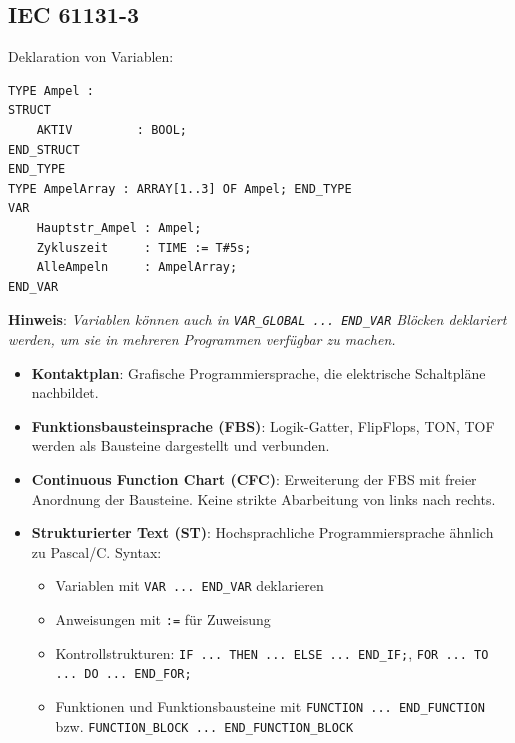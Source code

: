 \documentclass[9pt, a3paper, landscape]{article}
\newcommand{\algo}[1]{\textbf{\textcolor{blue!60!black}{#1}}}
\begin{document}
\begin{multicols*}{4}
\begin{itemize}
\section{IEC 61131-3}
Deklaration von Variablen:

\begin{lstlisting}[language=ST, numbers=none]
TYPE Ampel :
STRUCT
    AKTIV         : BOOL;
END_STRUCT
END_TYPE
TYPE AmpelArray : ARRAY[1..3] OF Ampel; END_TYPE
VAR
    Hauptstr_Ampel : Ampel;
    Zykluszeit     : TIME := T#5s;
    AlleAmpeln     : AmpelArray;
END_VAR
\end{lstlisting}

\algo{Hinweis}: \textit{Variablen können auch in \lstinline|VAR_GLOBAL ... END_VAR| Blöcken deklariert werden, um sie in mehreren Programmen verfügbar zu machen.}

\begin{itemize}
\item \algo{Kontaktplan}: Grafische Programmiersprache, die elektrische Schaltpläne nachbildet.
\begin{itemize}
    \item \texttt{--\verb|][--}: Öffner
    \item \texttt{--\verb|]\textbackslash{}[--}: Schließer 
    \item \texttt{--()\!--}: Spule (Aktor)
\end{itemize}
\item \algo{Funktionsbausteinsprache (FBS)}: Logik-Gatter, FlipFlops, TON, TOF werden als Bausteine dargestellt und verbunden.
\item \algo{Continuous Function Chart (CFC)}: Erweiterung der FBS mit freier Anordnung der Bausteine. Keine strikte Abarbeitung von links nach rechts.
\item \algo{Strukturierter Text (ST)}: Hochsprachliche Programmiersprache ähnlich zu Pascal/C. Syntax: 

\begin{itemize}
    \item Variablen mit \lstinline|VAR ... END_VAR| deklarieren
    \item Anweisungen mit \lstinline|:=| für Zuweisung
    \item Kontrollstrukturen: \lstinline|IF ... THEN ... ELSE ... END_IF;|, \lstinline|FOR ... TO ... DO ... END_FOR;|
    \item Funktionen und Funktionsbausteine mit \lstinline|FUNCTION ... END_FUNCTION| bzw. \lstinline|FUNCTION_BLOCK ... END_FUNCTION_BLOCK|
\end{itemize}


\end{itemize}
\end{itemize}
\end{multicols*}
\end{document}
